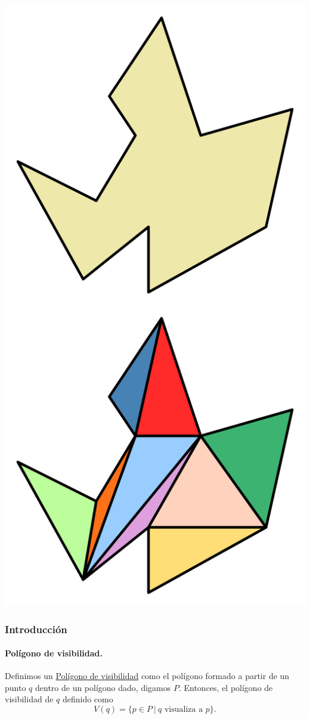 {\begin{frame}
  \centering \includegraphics[width=0.15 \paperwidth]{images/Visibility.png}
\end{frame}

\begin{frame}
  \frametitle{Introducción}
  \framesubtitle{Polígono de visibilidad.} %
  Definimos un \underline{Polígono de visibilidad} como el polígono formado a partir
  de un punto $q$ dentro de un polígono dado, digamos $P$. Entonces, el polígono
  de visibilidad de $q$ definido como
  \[V(q) = \{p \in P\ \big|\ q \text{ visualiza a } p\}.\]
\end{frame}

}
